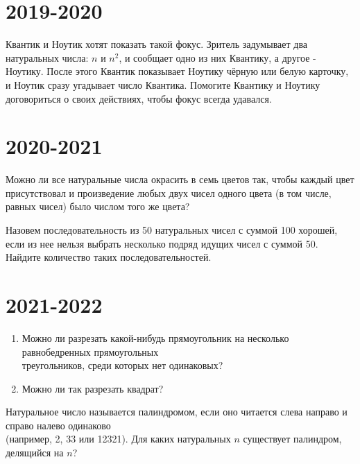 \documentclass[11pt, a4paper]{common/document_template}
\begin{document}
\chapter{2019-2020}

\begin{exercise}[16]
Квантик и Ноутик хотят показать такой фокус. Зритель задумывает два натуральных числа: $n$ и $n^{2}$, и сообщает одно из них Квантику, а другое - Ноутику. После этого Квантик показывает Ноутику чёрную или белую карточку, и Ноутик сразу угадывает число Квантика. Помогите Квантику и Ноутику договориться о своих действиях, чтобы фокус всегда удавался.
\end{exercise}

\chapter{2020-2021}

\begin{exercise}
Можно ли все натуральные числа окрасить в семь цветов так, чтобы каждый цвет присутствовал и произведение любых двух чисел одного цвета (в том числе, равных чисел) было числом того же цвета?
\end{exercise}

\begin{exercise}
Назовем последовательность из 50 натуральных чисел с суммой 100 хорошей, если из нее нельзя выбрать несколько подряд идущих чисел с суммой 50. Найдите количество таких последовательностей.
\end{exercise}

\chapter{2021-2022}

\begin{exercise}
\begin{enumerate}
\item Можно ли разрезать какой-нибудь прямоугольник на несколько равнобедренных прямоугольных \\ треугольников, среди которых нет одинаковых?
\item Можно ли так разрезать квадрат?
\end{enumerate}
\end{exercise}

\begin{exercise}[8]
Натуральное число называется палиндромом, если оно читается слева направо и справо налево одинаково \\ (например, 2, 33 или 12321). Для каких натуральных $n$ существует палиндром, делящийся на $n$?
\end{exercise}
\end{document}
